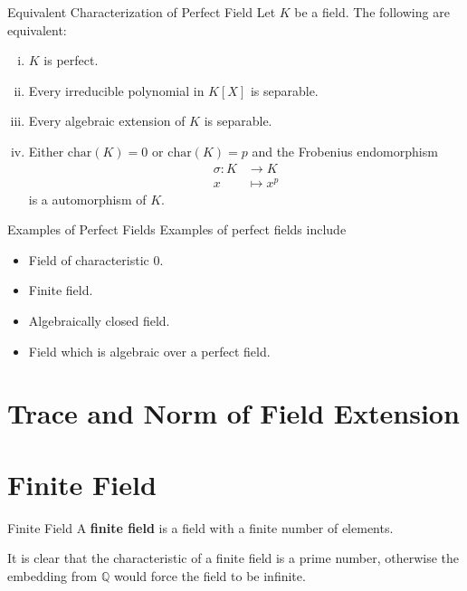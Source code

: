 \begin{definition}{Equivalent Characterization of Perfect Field}{}
    Let $K$ be a field. The following are equivalent:
    \begin{enumerate}[(i)]
        \item $K$ is perfect.
        \item Every irreducible polynomial in $K[X]$ is separable.
        \item Every algebraic extension of $K$ is separable.
        \item Either $\mathrm{char}(K)=0$ or $\mathrm{char}(K)=p$ and the Frobenius endomorphism 
        \begin{align*}
            \sigma:K&\longrightarrow K\\
            x&\longmapsto x^p
        \end{align*}
        is a automorphism of $K$.
    \end{enumerate}
    
\end{definition}

\begin{example}{Examples of Perfect Fields}{}
    Examples of perfect fields include
    \begin{itemize}
        \item Field of characteristic $0$.
        \item Finite field.
        \item Algebraically closed field.
        \item Field which is algebraic over a perfect field.
    \end{itemize}
\end{example}


\section{Trace and Norm of Field Extension}

\section{Finite Field}

\begin{definition}{Finite Field}{}
    A \textbf{finite field} is a field with a finite number of elements.
\end{definition}
It is clear that the characteristic of a finite field is a prime number, otherwise the embedding from $\mathbb{Q}$ would force the field to be infinite.

